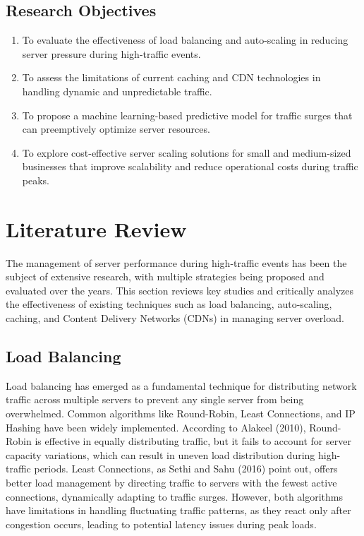 \documentclass[a4paper, 12pt]{article}
\begin{document}
\subsection{Research Objectives}
\begin{enumerate}
    \item To evaluate the effectiveness of load balancing and auto-scaling in reducing server pressure during high-traffic events.
    \item To assess the limitations of current caching and CDN technologies in handling dynamic and unpredictable traffic.
    \item To propose a machine learning-based predictive model for traffic surges that can preemptively optimize server resources.
    \item To explore cost-effective server scaling solutions for small and medium-sized businesses that improve scalability and reduce operational costs during traffic peaks.
\end{enumerate}

\section{Literature Review}
The management of server performance during high-traffic events has been the subject of extensive research, with multiple strategies being proposed and evaluated over the years. This section reviews key studies and critically analyzes the effectiveness of existing techniques such as load balancing, auto-scaling, caching, and Content Delivery Networks (CDNs) in managing server overload.

\subsection{Load Balancing}

Load balancing has emerged as a fundamental technique for distributing network traffic across multiple servers to prevent any single server from being overwhelmed. Common algorithms like Round-Robin, Least Connections, and IP Hashing have been widely implemented. According to Alakeel (2010), Round-Robin is effective in equally distributing traffic, but it fails to account for server capacity variations, which can result in uneven load distribution during high-traffic periods. Least Connections, as Sethi and Sahu (2016) point out, offers better load management by directing traffic to servers with the fewest active connections, dynamically adapting to traffic surges. However, both algorithms have limitations in handling fluctuating traffic patterns, as they react only after congestion occurs, leading to potential latency issues during peak loads.
\end{document}
